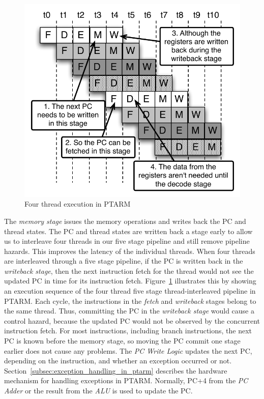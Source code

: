 \begin{figure}
  \vspace{-20pt}
  \begin{center}
    \includegraphics[scale=.65]{figs/four_thread_pipeline}
  \end{center}
  \vspace{-3mm}
  \caption{Four thread execution in PTARM}
  \label{fig:four_thread_pipeline}
  \vspace{-10pt}
\end{figure}      
     
The \emph{memory stage} issues the memory operations and writes back the PC and thread states.
The PC and thread states are written back a stage early to allow us to interleave four threads in our five stage pipeline and still remove pipeline hazards. 
This improves the latency of the individual threads. 
When four threads are interleaved through a five stage pipeline, if the PC is written back in the \emph{writeback stage}, then the next instruction fetch for the thread would not see the updated PC in time for its instruction fetch. 
Figure~\ref{fig:four_thread_pipeline} illustrates this by showing an execution sequence of the four thread five stage thread-interleaved pipeline in PTARM.
Each cycle, the instructions in the \emph{fetch} and \emph{writeback} stages belong to the same thread.
Thus, committing the PC in the \emph{writeback stage} would cause a control hazard, because the updated PC would not be observed by the concurrent instruction fetch.
For most instructions, including branch instructions, the next PC is known before the memory stage, so moving the PC commit one stage earlier does not cause any problems.  
The \emph{PC Write Logic} updates the next PC, depending on the instruction, and whether an exception occurred or not.
Section~\ref{subsec:exception_handling_in_ptarm} describes the hardware mechanism for handling exceptions in PTARM. 
Normally, PC+4 from the \emph{PC Adder} or the result from the \emph{ALU} is used to update the PC.

